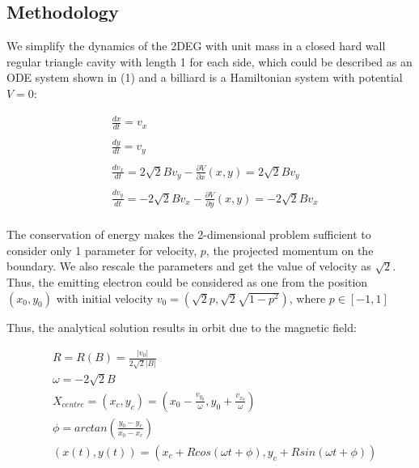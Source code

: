 \documentclass[a0,portrait]{a0poster}
\begin{document}
\begin{multicols}{3}
\section*{Methodology}

\noindent
We simplify the dynamics of the 2DEG with unit mass in a closed hard wall regular triangle cavity with length 1 for each side, which could be described as an ODE system shown in (1) and a billiard is a Hamiltonian system with potential $V=0$:

\begin{equation}
\begin{aligned}
& \frac{dx}{dt}=v_x\\
\\
& \frac{dy}{dt}=v_y\\
\\
& \frac{d v_x}{dt}=2\sqrt{2}Bv_y-\frac{\partial V}{\partial x}(x,y)=2\sqrt{2}Bv_y\\
\\
& \frac{d v_y}{dt}=-2\sqrt{2}Bv_x-\frac{\partial V}{\partial y}(x,y)=-2\sqrt{2}Bv_x\\
\end{aligned}
\end{equation}

The conservation of energy makes the 2-dimensional problem sufficient to consider only 1 parameter for velocity, $p$, the projected momentum on the boundary. We also rescale the parameters and get the value of velocity as $\sqrt{2}$. Thus, the emitting electron could be considered as one from the position $(x_0,y_0)$ with initial velocity $v_0=(\sqrt{2}p,\sqrt{2}\sqrt{1-p^2})$, where $p \in [-1,1]$

Thus, the analytical solution results in orbit due to the magnetic field:

\begin{equation}
\begin{aligned}
& R=R(B)=\frac{|v_0|}{2\sqrt{2}|B|}\\
& \omega=-2\sqrt{2}B\\
& X_{centre}=(x_c,y_c)=(x_0-\frac{v_{y_0}}{\omega},y_0+\frac{v_{x_0}}{\omega})\\
& \phi=arctan(\frac{y_0-y_c}{x_0-x_c})\\
& (x(t),y(t))=(x_c+Rcos(\omega t+\phi), y_c+Rsin(\omega t+\phi))\\
\end{aligned}
\end{equation}


\end{multicols}
\end{document}
